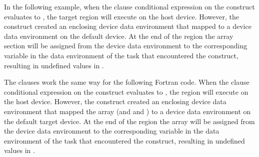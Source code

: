 In the following example, when the  clause conditional expression on 
the  construct evaluates to , the target region will 
execute on the host device. However, the  construct 
created an enclosing device data environment that mapped  to a device data 
environment on the default device. At the end of the  
region the array section  will be assigned from the device data environment 
to the corresponding variable in the data environment of the task that encountered 
the  construct, resulting in undefined values in .


The  clauses work the same way for the following Fortran code. When 
the  clause conditional expression on the  construct 
evaluates to , the  region will execute on the host 
device. However, the  construct created an enclosing 
device data environment that mapped the  array (and  and ) to a device data 
environment on the default target device. At the end of the  
region the  array will be assigned from the device data environment to the corresponding 
variable in the data environment of the task that encountered the  construct, resulting in undefined values in .


